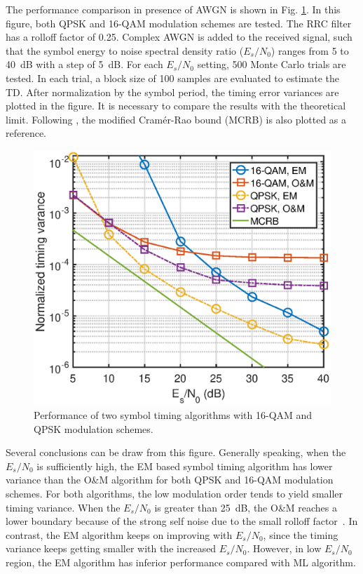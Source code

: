 \documentclass[journal,comsoc, onecolumn, 12pt,draftclsnofoot]{IEEEtran} %
\begin{document}
The performance comparison in presence of AWGN is shown in Fig. \ref{fig:timing_per}.
In this figure, both QPSK and 16-QAM modulation schemes are tested.
The RRC filter has a rolloff factor of 0.25. 
Complex AWGN is added to the received signal, such that the symbol energy to noise spectral density ratio (\(E_s/N_0\)) ranges from 5 to 40~dB with a step of 5~dB.
For each \(E_s/N_0\) setting, 500 Monte Carlo trials are tested.
In each trial, a block size of 100 samples are evaluated to estimate the TD.
After normalization by the symbol period, the timing error variances are plotted in the figure.
It is necessary to compare the results with the theoretical limit.
Following \cite{mengali1997synchronization}, the modified Cram\'er-Rao bound (MCRB) is also plotted as a reference.

\begin{figure}[ht]
\centering
\includegraphics[width=3 in]{pic/per_timing.eps}
\caption{Performance of two symbol timing algorithms with 16-QAM and QPSK modulation schemes.}
\label{fig:timing_per} 
\end{figure}   

Several conclusions can be draw from this figure.
Generally speaking, when the  \(E_s/N_0\) is sufficiently high, the EM based symbol timing algorithm has lower variance than the O\&M algorithm for both QPSK and 16-QAM modulation schemes.
For both algorithms, the low modulation order tends to yield smaller timing variance.
When the \(E_s/N_0\) is greater than 25~dB, the O\&M reaches a lower boundary because of the strong self noise due to the small rolloff factor~\cite{mengali1997synchronization}. 
% 
% 
In contrast, the EM algorithm keeps on improving with \(E_s/N_0\), since the timing variance keeps getting smaller with the increased \(E_s/N_0\).
However, in low \(E_s/N_0\) region, the EM algorithm has inferior performance compared with ML algorithm.
\end{document}
